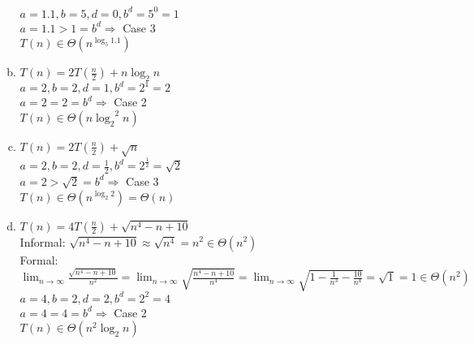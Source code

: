 \documentclass[11pt]{article}
\begin{document}
\begin{enumerate}
\begin{enumerate}[(a)]
					\hspace*{.4cm}
					$ a=1.1, b=5, d=0, b^d=5^0=1 $ \\
					\hspace*{.4cm}
					$ a=1.1 > 1 =b^d \Rightarrow $ Case 3 \\
					\hspace*{.4cm}
					$ T(n) \in \Theta(n^{\log_5 1.1}) $ \\
			\item
				$ T(n) = 2T(\frac{n}{2}) + n \log_2 n $ \\
					\hspace*{.4cm}
					$ a=2, b=2, d=1, b^d=2^1=2 $ \\
					\hspace*{.4cm}
					$ a=2 = 2=b^d \Rightarrow $ Case  2\\
					\hspace*{.4cm}
					$ T(n) \in \Theta(n {\log_2}^2 n) $ \\
			\item
				$ T(n) = 2T(\frac{n}{2}) + \sqrt{n} $ \\
					\hspace*{.4cm}
					$ a=2, b=2, d=\frac{1}{2}, b^d=2^{\frac{1}{2}}=\sqrt{2} $ \\
					\hspace*{.4cm}
					$ a=2 > \sqrt{2}=b^d \Rightarrow $ Case 3 \\
					\hspace*{.4cm}
					$ T(n) \in \Theta(n^{\log_2 2}) = \Theta(n) $ \\
			\item
				$ T(n) = 4T(\frac{n}{2}) + \sqrt{n^4-n+10} $ \\
					\hspace*{.4cm}
					Informal: $ \sqrt{n^4-n+10} \approx \sqrt{n^4} = n^2 \in \Theta(n^2) $ \\
					\hspace*{.4cm}
					Formal: $ \lim_{n\to\infty}\frac{\sqrt{n^4-n+10}}{n^2}
							= \lim_{n\to\infty} \sqrt{\frac{n^4-n+10}{n^4}} 
							= \lim_{n\to\infty} \sqrt{1- \frac{1}{n^3} - \frac{10}{n^4}} 
							= \sqrt{1} = 1 \in \Theta(n^2) $
					\hspace*{.4cm}
					$ a=4, b=2, d=2, b^d=2^2=4 $ \\
					\hspace*{.4cm}
					$ a=4 = 4=b^d \Rightarrow $ Case 2 \\
					\hspace*{.4cm}
					$ T(n) \in \Theta(n^2 \log_2 n) $ \\

\end{enumerate}
\end{enumerate}
\end{document}
